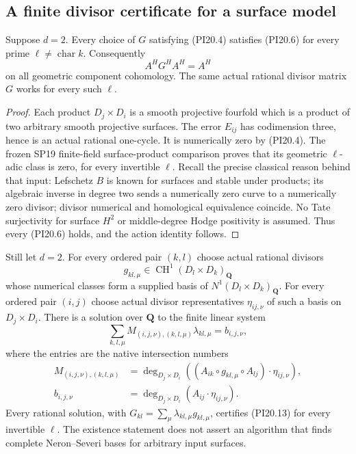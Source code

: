 \subsection{A finite divisor certificate for a surface model}

\begin{theorem}
\label{r20pi:surface}
Suppose $d=2$.  Every choice of $G$ satisfying (PI20.4) satisfies
(PI20.6) for every prime $\ell\ne\operatorname{char}k$.
Consequently
\[
                         A^HG^HA^H=A^H
 \tag{PI20.13}\label{r20pi:surfaceinverse}
\]
on all geometric component cohomology.  The same actual rational
divisor matrix $G$ works for every such $\ell$.
\end{theorem}

\begin{proof}
Each product $D_j\times D_i$ is a smooth projective fourfold
which is a product of two arbitrary smooth projective surfaces.
The error $E_{ij}$ has codimension three, hence is an actual
rational one-cycle.  It is numerically zero by (PI20.4).
The frozen SP19 finite-field surface-product comparison proves
that its geometric $\ell$-adic class is zero, for every invertible
$\ell$.  Recall the precise classical reason behind that input:
Lefschetz $B$ is known for surfaces and stable under products;
its algebraic inverse in degree two sends a numerically zero
curve to a numerically zero divisor; divisor numerical and
homological equivalence coincide.  No Tate surjectivity for
surface $H^2$ or middle-degree Hodge positivity is assumed.
Thus every (PI20.6) holds, and the action identity follows.
\end{proof}

\begin{proposition}
\label{r20pi:certificate}
Still let $d=2$.  For every ordered pair $(k,l)$ choose actual
rational divisors
\[
 g_{kl,\mu}\in\operatorname{CH}^1(D_l\times D_k)_{\mathbf Q}
 \tag{PI20.14}\label{r20pi:basis}
\]
whose numerical classes form a supplied basis of
$N^1(D_l\times D_k)_{\mathbf Q}$.
For every ordered pair $(i,j)$ choose actual divisor representatives
$\eta_{ij,\nu}$ of such a basis on $D_j\times D_i$.
There is a solution over $\mathbf Q$ to the finite linear system
\[
 \sum_{k,l,\mu} M_{(i,j,\nu),(k,l,\mu)}\lambda_{kl,\mu}
                           =b_{i,j,\nu},
 \tag{PI20.15}\label{r20pi:linearsystem}
\]
where the entries are the native intersection numbers
\[
 \begin{split}
 M_{(i,j,\nu),(k,l,\mu)}
   &=\deg_{D_j\times D_i}
       \left((A_{ik}\circ g_{kl,\mu}\circ A_{lj})
                                      \cdot\eta_{ij,\nu}\right),\\
 b_{i,j,\nu}
   &=\deg_{D_j\times D_i}(A_{ij}\cdot\eta_{ij,\nu}).
 \end{split}
 \tag{PI20.16}\label{r20pi:matrix}
\]
Every rational solution, with
$G_{kl}=\sum_\mu\lambda_{kl,\mu}g_{kl,\mu}$, certifies
(PI20.13) for every invertible $\ell$.
The existence statement does not assert an algorithm that finds
complete Neron--Severi bases for arbitrary input surfaces.
\end{proposition}

